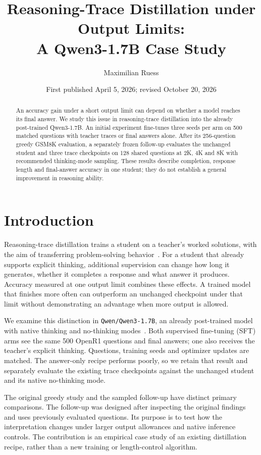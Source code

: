 \documentclass[11pt]{article}
\title{Reasoning-Trace Distillation under Output Limits:\\A Qwen3-1.7B Case Study}
\author{Maximilian Ruess}
\date{First published April 5, 2026; revised October 20, 2026}
\begin{document}
\maketitle
\begin{abstract}
An accuracy gain under a short output limit can depend on whether a model reaches its final answer. We study this issue in reasoning-trace distillation into the already post-trained Qwen3-1.7B. An initial experiment fine-tunes three seeds per arm on 500 matched questions with teacher traces or final answers alone. After its 256-question greedy GSM8K evaluation, a separately frozen follow-up evaluates the unchanged student and three trace checkpoints on 128 shared questions at 2K, 4K and 8K with recommended thinking-mode sampling.  These results describe completion, response length and final-answer accuracy in one student; they do not establish a general improvement in reasoning ability.
\end{abstract}

\section{Introduction}
Reasoning-trace distillation trains a student on a teacher's worked solutions, with the aim of transferring problem-solving behavior~\cite{stepwise,r1}. For a student that already supports explicit thinking, additional supervision can change how long it generates, whether it completes a response and what answer it produces. Accuracy measured at one output limit combines these effects. A trained model that finishes more often can outperform an unchanged checkpoint under that limit without demonstrating an advantage when more output is allowed.

We examine this distinction in \texttt{Qwen/Qwen3-1.7B}, an already post-trained model with native thinking and no-thinking modes~\cite{qwen}. Both supervised fine-tuning (SFT) arms see the same 500 OpenR1 questions and final answers; one also receives the teacher's explicit thinking. Questions, training seeds and optimizer updates are matched. The answer-only recipe performs poorly, so we retain that result and separately evaluate the existing trace checkpoints against the unchanged student and its native no-thinking mode.



The original greedy study and the sampled follow-up have distinct primary comparisons. The follow-up was designed after inspecting the original findings and uses previously evaluated questions. Its purpose is to test how the interpretation changes under larger output allowances and native inference controls. The contribution is an empirical case study of an existing distillation recipe, rather than a new training or length-control algorithm.
\end{document}

